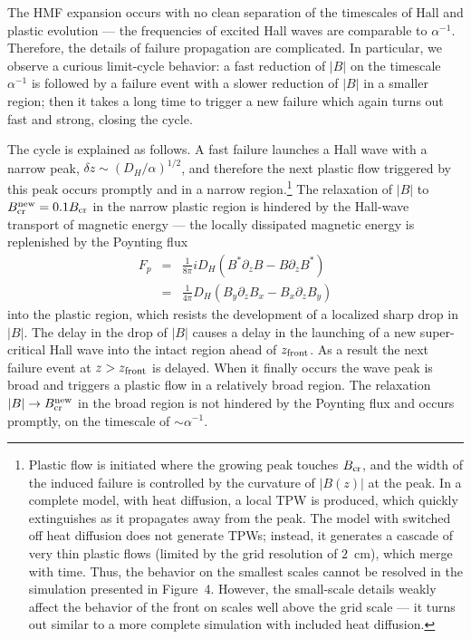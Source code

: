 The HMF expansion occurs with 
no clean separation of the timescales of Hall and 
plastic evolution --- the frequencies of excited Hall waves are comparable to $\alpha^{-1}$.
Therefore, the details of failure propagation are complicated. In particular, we 
observe a curious limit-cycle behavior:
a fast reduction of $|B|$ on the timescale $\alpha^{-1}$ is followed by a failure
event with a slower reduction of $|B|$ in a smaller region; then it takes a long 
time to trigger a new failure which again turns out fast and strong, closing the cycle.

The cycle is explained as follows. A fast failure launches a Hall wave with
a narrow peak, $\delta z\sim (D_H/\alpha)^{1/2}$, and therefore the next plastic 
flow triggered by this peak occurs promptly and in a narrow region.\footnote{Plastic 
     flow is initiated where the growing peak touches $B_{\rm cr}$, and the width of the induced 
     failure is controlled by the curvature of $|B(z)|$ at the peak.
     In a complete model, with heat diffusion,
     a local TPW is produced, which quickly extinguishes as it propagates
     away from the peak. The model with switched off heat diffusion does not generate TPWs; 
     instead, it generates a cascade of very thin plastic flows (limited by the grid resolution of
     $2$~cm), which merge with time. Thus, the behavior on the smallest scales cannot be 
     resolved in the simulation presented in Figure~4. However, the small-scale details weakly 
     affect the behavior
     of the front on scales well above the grid scale --- it turns out similar to 
     a more complete simulation with included heat diffusion.
     }    
The relaxation of $|B|$ to $B_{\rm cr}^{\rm new}=0.1B_{\rm cr}$ in the narrow plastic region
is hindered by the Hall-wave transport of magnetic energy
--- the locally dissipated magnetic energy is replenished 
by the Poynting flux 
\begin{eqnarray}
F_p&=&\frac{1}{8\pi} i D_H(B^*\partial_z B-B\partial_z B^*) \nonumber\\
 &=&\frac{1}{4\pi}D_H(B_y\partial_z B_x-B_x\partial_z B_y)
\end{eqnarray}
into the plastic region, which resists the development of a localized
sharp drop in $|B|$.
The delay in the drop of $|B|$ causes a delay in the launching of a new super-critical 
Hall wave into the intact region ahead of $z_{\rm front}$.
As a result the next failure event at $z>z_{\rm front}$ is 
delayed. When it finally occurs the wave peak is broad and triggers a plastic flow in a 
relatively broad region.  The relaxation $|B|\rightarrow B_{\rm cr}^{\rm new}$ in the broad 
region is not hindered by the Poynting flux and occurs promptly, on the timescale of 
$\sim \alpha^{-1}$.

